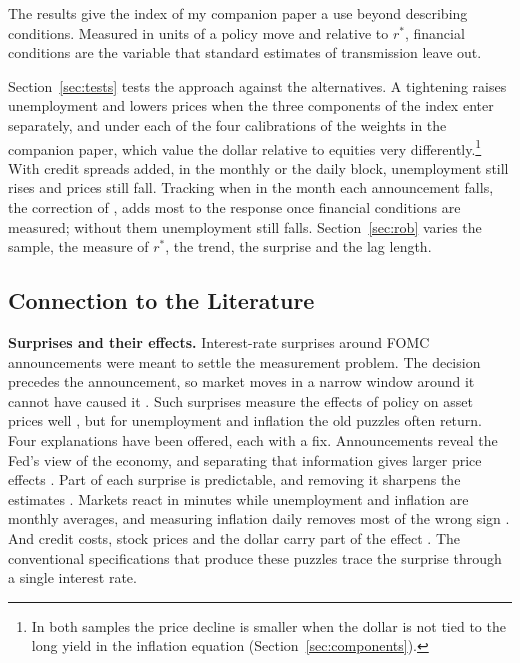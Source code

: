 \documentclass[11pt]{article}
\newcommand{\rs}{r^{*}}
\begin{document}
The results give the index of my companion paper \citep{fcinote} a use beyond describing conditions. Measured in units of a policy move and relative to $\rs$, financial conditions are the variable that standard estimates of transmission leave out.

Section~\ref{sec:tests} tests the approach against the alternatives. A tightening raises unemployment and lowers prices when the three components of the index enter separately, and under each of the four calibrations of the weights in the companion paper, which value the dollar relative to equities very differently.\footnote{In both samples the price decline is smaller when the dollar is not tied to the long yield in the inflation equation (Section~\ref{sec:components}).} With credit spreads added, in the monthly or the daily block, unemployment still rises and prices still fall. Tracking when in the month each announcement falls, the correction of \citet{jacobson2026}, adds most to the response once financial conditions are measured; without them unemployment still falls. Section~\ref{sec:rob} varies the sample, the measure of $\rs$, the trend, the surprise and the lag length.

\subsection{Connection to the Literature}
\textbf{Surprises and their effects.} Interest-rate surprises around FOMC announcements were meant to settle the measurement problem. The decision precedes the announcement, so market moves in a narrow window around it cannot have caused it \citep{kuttner2001,gurkaynak2005}. Such surprises measure the effects of policy on asset prices well \citep{bernanke2005,hanson2015,nakamura2018,swanson2021}, but for unemployment and inflation the old puzzles often return. Four explanations have been offered, each with a fix. Announcements reveal the Fed's view of the economy, and separating that information gives larger price effects \citep{romer2000,nakamura2018,jarocinski2020,miranda2021}. Part of each surprise is predictable, and removing it sharpens the estimates \citep{bauer2023,bauer2023aer}. Markets react in minutes while unemployment and inflation are monthly averages, and measuring inflation daily removes most of the wrong sign \citep{jacobson2026}. And credit costs, stock prices and the dollar carry part of the effect \citep{gertler2015,caldara2019,kroencke2021,bauer2023jep,boehm2024,bauer2026,boehm2026}. The conventional specifications that produce these puzzles trace the surprise through a single interest rate.
\end{document}
